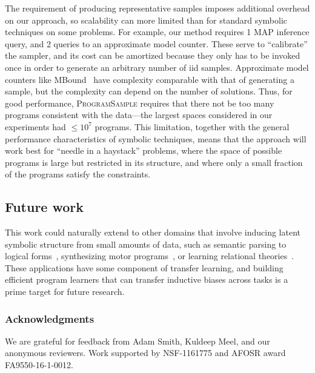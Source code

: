 \documentclass{article}
\newcommand{\theSystem}{\textsc{ProgramSample}}
\begin{document}
The requirement of producing representative samples imposes 
additional overhead on our approach, so scalability can more limited
than for standard symbolic techniques on some problems. For example,
our method requires 1 MAP inference query, and 2 queries to an
approximate model counter. These serve to ``calibrate'' the sampler, and its cost can be
amortized because they only has to be invoked once in order to generate
an arbitrary number of iid samples. Approximate model counters like
MBound~\cite{gomes2006model} have complexity comparable with that of
generating a sample, but the complexity can depend on the
number of solutions.  Thus, for good performance,
\theSystem{} requires that there not be too many programs consistent
with the data---the largest spaces considered in our experiments had
$\leq 10^7$ programs. This limitation, together with the general
performance characteristics of symbolic techniques, means that the
approach will work best for ``needle in a haystack'' problems, where
the space of possible programs is large but restricted in its
structure, and where only a small fraction of the programs satisfy
the constraints.


\subsection{Future work}
This work could naturally extend to other domains that involve inducing latent symbolic structure from small amounts of data,
such as semantic parsing to logical forms~\cite{liang11dcs},
synthesizing motor programs~\cite{lake2015human},
or learning relational theories~\cite{logical}.
These applications have some component of transfer learning,
and building efficient program learners that can transfer inductive biases across tasks is a prime target for future research.


\subsubsection*{Acknowledgments} We are grateful for feedback from Adam Smith, Kuldeep Meel, and our anonymous reviewers.
Work supported by NSF-1161775 and AFOSR award FA9550-16-1-0012.


{\small }
\end{document}
